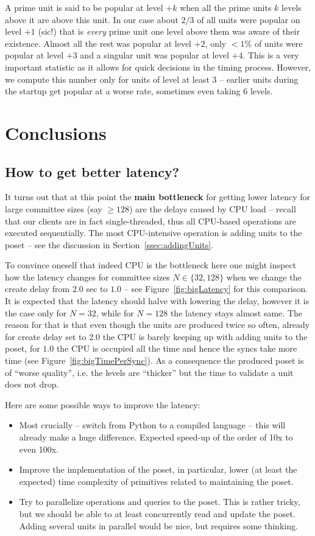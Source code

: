 \documentclass[a4paper,10pt]{article}
\begin{document}
		A prime unit is said to be popular at level $+k$ when all the prime units $k$ levels above it are above this unit.
		In our case about $2/3$ of all units were popular on level $+1$ (sic!) that is \emph{every} prime unit one level above them was aware of their existence.
		Almost all the rest was popular at level $+2$, only $<1\%$ of units were popular at level $+3$ and a singular unit was popular at level $+4$.
		This is a very important statistic as it allows for quick decisions in the timing process.
		However, we compute this number only for units of level at least $3$ -- earlier units during the startup get popular at a worse rate, sometimes even taking $6$ levels.

	\section{Conclusions}

		\subsection{How to get better latency?}
			It turns out that at this point the {\bf main bottleneck} for getting lower latency for large committee sizes (say $\geq 128$) are the delays caused by CPU load -- recall that our clients are in fact single-threaded, thus all CPU-based operations are executed sequentially.
			The most CPU-intensive operation is adding units to the poset -- see the discussion in Section~\ref{ssec:addingUnits}.

			To convince oneself that indeed CPU is the bottleneck here one might inspect how the latency changes for committee sizes $N \in \{32, 128\}$
			when we change the create delay from $2.0$ sec to $1.0$ -- see Figure~\ref{fig:bigLatency} for this comparison.
			It is expected that the latency should halve with lowering the delay, however it is the case only for $N=32$, while for $N=128$ the latency stays almost same.
			The reason for that is that even though the units are produced twice so often, already for create delay set to $2.0$ the CPU is barely keeping up with adding units to the poset, for $1.0$ the CPU is occupied all the time and hence the syncs take more time (see Figure~\ref{fig:bigTimePerSync}). As a consequence the produced poset is of ``worse quality'', i.e. the levels are ``thicker'' but the time to validate a unit does not drop.

			Here are some possible ways to improve the latency:
			\begin{itemize}
				\item Most crucially -- switch from Python to a compiled language -- this will already make a huge difference. Expected speed-up of the order of 10x to even 100x.
				\item Improve the implementation of the poset, in particular, lower (at least the expected) time complexity of primitives related to
				maintaining the poset.
				\item Try to parallelize operations and queries to the poset. This is rather tricky, but we should be able to at least concurrently read and update the poset. Adding several units in parallel would be nice, but requires some thinking.
			\end{itemize}
\end{document}
